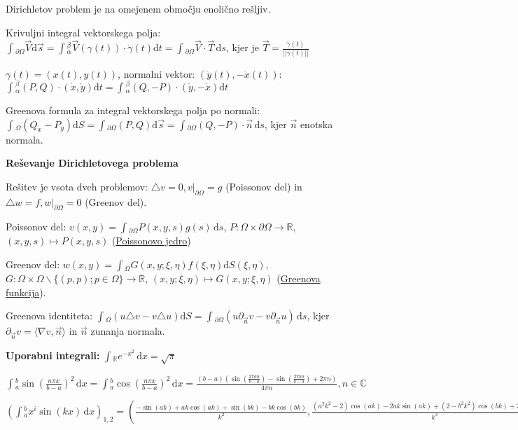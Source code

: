 \documentclass[10pt,a4paper]{amsart}
\theoremstyle{definition} %
\theoremstyle{plain} %
\newcommand{\ds}{\ensuremath{\,\mathrm{d}s}}
\newcommand{\dx}{\ensuremath{\,\mathrm{d}x}}
\let\oldint\int
\renewcommand{\int}{\oldint \!}
\newcommand{\R}{\mathbb R}
\newcommand{\C}{\mathbb C}
\begin{document}
Dirichletov problem je na omejenem območju enolično rešljiv.

Krivuljni integral vektorskega polja: $\int_{\partial \Omega}\vec{V}
\mathrm{d}\vec{s} = \int_\alpha^\beta \vec{V}(\gamma (t))\cdot \dot{\gamma} (t)
\mathrm{d}t = \int_{\partial \Omega} \vec{V} \cdot \vec{T} \ds$, kjer je
$\vec{T} = \frac{\dot{\gamma}(t)}{||\dot{\gamma}(t)||}$

$\gamma (t) = (x(t),y(t))$, normalni vektor: $(\dot{y}(t), -\dot{x}(t))$:
$\int_\alpha^\beta (P,Q)\cdot (\dot{x},\dot{y}) \mathrm{d}t = \int_\alpha^\beta
(Q,-P)\cdot (\dot{y},-\dot{x}) \mathrm{d}t $

Greenova formula za integral vektorskega polja po normali: $\int_\Omega (Q_x -
P_y)  \mathrm{d} S = \int_{\partial \Omega} (P,Q)  \mathrm{d}\vec{s} =
\int_{\partial \Omega} (Q,-P) \cdot \vec{n} \ds$, kjer $\vec{n}$ enotska
normala.

\textbf{Reševanje Dirichletovega problema}

Rešitev je vsota dveh problemov: $\triangle v = 0, v|_{\partial \Omega} = g$
(Poissonov del) in $\triangle w = f, w|_{\partial \Omega} = 0$ (Greenov del).

Poissonov del: $v(x,y) = \int_{\partial \Omega} P(x,y,s)g(s)\ds$, $P:\Omega
\times \partial \Omega \rightarrow \R$, $(x,y,s) \mapsto P(x,y,s)$
(\underline{Poissonovo jedro})

Greenov del: $w(x,y) = \int_\Omega G(x,y;\xi,\eta ) f(\xi , \eta )
\mathrm{d}S(\xi,\eta)$, $G: \Omega \times \Omega \backslash \{ (p,p); p\in
\Omega \}  \rightarrow \R$, $(x,y;\xi,\eta) \mapsto G(x,y; \xi, \eta)$
(\underline{Greenova funkcija}).

Greenova identiteta: $\int_\Omega (u \triangle v - v \triangle u)  \mathrm{d}S =
\int_{\partial \Omega} (u \partial_{\vec{n}}v - v \partial_{\vec{n}} u) \ds$,
kjer $\partial_{\vec{n}} v = \langle \nabla v , \vec{n} \rangle$ in $\vec{n}$
zunanja normala.

\textbf{Uporabni integrali:}
$\int_\R e^{-x^2} \dx = \sqrt{\pi}$

$\int_a^b \sin(\frac{n\pi x}{b-a})^2 \dx = \int_a^b \cos(\frac{n\pi x}{b-a})^2 \dx =
\frac{(b-a) \left(\sin \left(\frac{2 \pi  a n}{b-a}\right)-\sin \left(\frac{2
\pi  b n}{b-a}\right)+2 \pi  n\right)}{4 \pi  n}, n \in \C$

$(\int_a^bx^i \sin(kx)\dx)_{1,2} = (\frac{-\sin (a k)+a k \cos (a k)+\sin (b k)-b k \cos (b k)}{k^2},\frac{(a^2 k^2-2) \cos (a k)-2 a k \sin (a k)+(2-b^2 k^2) \cos (b k)+2 b k \sin (b k)}{k^3})$
\end{document}
